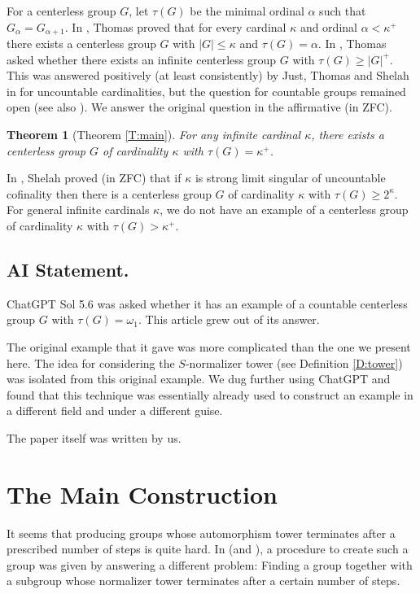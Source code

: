 \documentclass[10pt,a4paper]{amsart}
\theoremstyle{plain}
\newtheorem*{theorem*}{Theorem}
\theoremstyle{definition}
\newcounter{step}
\begin{document}
For a centerless group $G$, let $\tau(G)$ be the minimal ordinal $\alpha$ such that $G_\alpha=G_{\alpha +1}$. In \cite{Thomas}, Thomas proved that for every cardinal $\kappa$ and ordinal $\alpha< \kappa^+$ there exists a centerless group $G$ with $|G|\leq \kappa$ and $\tau(G)=\alpha$.  In \cite[Question 1.9]{thomasII}, Thomas asked whether there exists an infinite centerless group $G$ with $\tau(G)\geq |G|^+$. This was answered positively (at least consistently) by Just, Thomas and Shelah in \cite{JuShTh} for uncountable cardinalities, but the question for countable groups remained open (see also \cite[Question 3.1.16]{ThomasBook}). We answer the original question in the affirmative (in ZFC). 

\begin{theorem*}[Theorem \ref{T:main}]
For any infinite cardinal $\kappa$, there exists a centerless group $G$ of cardinality $\kappa$ with $\tau(G)=\kappa^+$.
\end{theorem*}


In \cite{Sh:810}, Shelah proved (in ZFC) that if $\kappa$ is  strong limit singular of uncountable cofinality then there is a centerless group $G$ of cardinality $\kappa$ with $\tau(G)\geq 2^\kappa$. For general infinite cardinals $\kappa$, we do not have an example of a centerless group of cardinality $\kappa$ with $\tau(G)>\kappa^+$. 


\subsection*{AI Statement.}  ChatGPT Sol 5.6 was asked whether it has an example of a countable centerless group $G$ with $\tau(G)=\omega_1$. This article grew out of its answer.

The original example that it gave was more complicated than the one we present here. 
The idea for considering the $S$-normalizer tower (see Definition \ref{D:tower}) was isolated from this original example. 
We dug further using ChatGPT and found that this technique was essentially already used to construct an example in a different field and under a different guise.

The paper itself was written by us.


\section{The Main Construction}
It seems that producing groups whose automorphism tower terminates after a prescribed number of steps is quite hard. In \cite{Thomas} (and \cite{JuShTh}), a procedure to create such a group was given by answering a different problem: Finding a group together with a subgroup whose normalizer tower terminates after a certain number of steps. 
\end{document}
